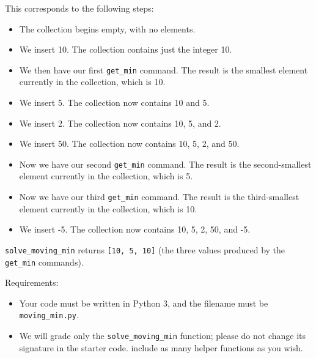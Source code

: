 \documentclass{assignment-263}
\begin{document}
\begin{enumerate}
This corresponds to the following steps:
\begin{itemize}
\item The collection begins empty, with no elements.
\item We insert 10. The collection contains just the integer 10.
\item We then have our first \verb|get_min| command. The result is the smallest element currently in the collection, which is 10.
\item We insert 5. The collection now contains 10 and 5.
\item We insert 2. The collection now contains 10, 5, and 2.
\item We insert 50. The collection now contains 10, 5, 2, and 50.
\item Now we have our second \verb|get_min| command. The result is the second-smallest element currently in the collection, which is 5.
\item Now we have our third \verb|get_min| command. The result is the third-smallest element currently in the collection, which is 10.
\item We insert -5. The collection now contains 10, 5, 2, 50, and -5.
\end{itemize}

\verb|solve_moving_min| returns \verb|[10, 5, 10]| (the three values produced by the \verb|get_min| commands).
   
Requirements:
\begin{itemize}
\item Your code must be written in Python 3, and the filename must be \verb|moving_min.py|.
\item We will grade only the \verb|solve_moving_min| function; please do not change its signature in the starter code. include as many helper functions as you wish.
   \end{itemize}
   

\end{enumerate}
\end{document}
